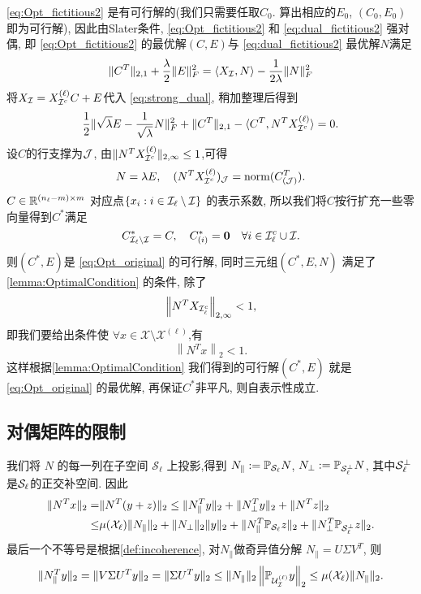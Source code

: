 \eqref{eq:Opt_fictitious2} 是有可行解的(我们只需要任取\(C_0\).
算出相应的\(E_0\), \((C_0, E_0)\)即为可行解), 因此由Slater条件\cite{boyd2004convex},
\eqref{eq:Opt_fictitious2} 和 \eqref{eq:dual_fictitious2} 强对偶,
即 \eqref{eq:Opt_fictitious2} 的最优解\((C, E)\)与 \eqref{eq:dual_fictitious2} 最优解\(N\)满足
\begin{align}\label{eq:strong_dual}
  \|C^T\|_{2,1}+\frac{\lambda}{2}\|E\|_F^2 = \langle X_{\mathcal{I}},N \rangle -
  \frac{1}{2\lambda} \|N\|_F^2   
\end{align}
将\(X_{\mathcal{I}}=X^{(\ell)}_{\mathcal{I}^c}C+E\)代入 \eqref{eq:strong_dual},   稍加整理后得到
\[ \frac{1}{2}\| \sqrt{\lambda}E-\frac{1}{\sqrt{\lambda}}N \|_F^2+
\|C^T\|_{2,1}-\langle C^T, N^T X^{(\ell)}_{\mathcal{I}^c}\rangle = 0. \]
设\(C\)的行支撑为\(\mathcal{J}\), 由\(\|N^T X^{(\ell)}_{\mathcal{I}^c}\|_{2, \infty} \leq 1\),可得
\begin{align*}
  N=\lambda E, \quad (N^T X^{(\ell)}_{\mathcal{I}^c})_{\mathcal{J}} =\operatorname{norm}(C_{(\mathcal{J})}^T).
\end{align*}
\(C\in \mathbb{R}^{(n_\ell-m)\times m}\) 对应点\(\{ x_i: i \in \mathcal{I}_\ell \setminus \mathcal{I}\}\)
的表示系数, 所以我们将\(C\)按行扩充一些零向量得到\(C^*\)满足
\[ C^*_{\mathcal{I}_\ell \setminus \mathcal{I}} = C, \quad C^*_{(i)} = \mathbf{0}
\quad \forall i \in \mathcal{I}^c_\ell \cup \mathcal{I}. \]
则\((C^*, E)\)是 \eqref{eq:Opt_original} 的可行解, 同时三元组\((C^*, E, N)\)
满足了\autoref{lemma:OptimalCondition} 的条件, 除了
\begin{equation*}
  \left\|N^T X_{\mathcal{I}_\ell^c}\right\|_{2,\infty}<1,
\end{equation*}
即我们要给出条件使 \(\forall x \in \mathcal{X}\setminus \mathcal{X}^{(\ell)}\),有
\begin{equation}\label{eq:dual_separation_condition}
   \left \| N^T x\right \|_2 < 1.
\end{equation}
这样根据\autoref{lemma:OptimalCondition} 我们得到的可行解\((C^*, E)\)
就是 \eqref{eq:Opt_original} 的最优解, 再保证\(C^*\)非平凡, 则自表示性成立.

\subsection{对偶矩阵的限制}\label{sec:dual_separation}
我们将 \(N\) 的每一列在子空间 \(\mathcal{S}_{\ell}\) 上投影,得到
\(N_{\parallel}:=\mathbb{P}_{\mathcal{S}_\ell}N\), \(N_{\perp} := \mathbb{P}_{\mathcal{S}_{\ell}^\perp}N\),
其中\(\mathcal{S}_\ell^\perp\)是\(\mathcal{S}_\ell\)的正交补空间. 因此
\begin{align}\label{eq:showing_dual_sep_cond}
  \| N^T x \|_2 =& \| N^T (y+z)\|_2 \leq \| N_{\parallel}^T y\|_2+\|
  N_{\perp}^T y\|_2+\|N^T z\|_2 \nonumber\\
  \leq& \mu(\mathcal{X}_{\ell}) \|N_{\parallel}\|_2 + \|N_{\perp}\|_2\|y\|_2
  + \|N_{\parallel}^T \mathbb{P}_{\mathcal{S}_{\ell}} z\|_2 
  + \|N_\perp^T \mathbb{P}_{\mathcal{S}_\ell^\perp} z\|_2 .
\end{align}
最后一个不等号是根据\autoref{def:incoherence},   对\(N_\parallel\)做奇异值分解
\(N_\parallel = U\Sigma V^T\), 则
\[
  \|N_\parallel^T y\|_2 = \|V \Sigma U^T y\|_2 = \|\Sigma U^T y\|_2 \le
  \|N_\parallel\|_2 \left\|\mathbb{P}_{\mathcal{U}_{\mathcal{I}}^{(\ell)}} y\right\|_2 \le \mu(\mathcal{X}_\ell)
  \|N_\parallel\|_2.
\]

